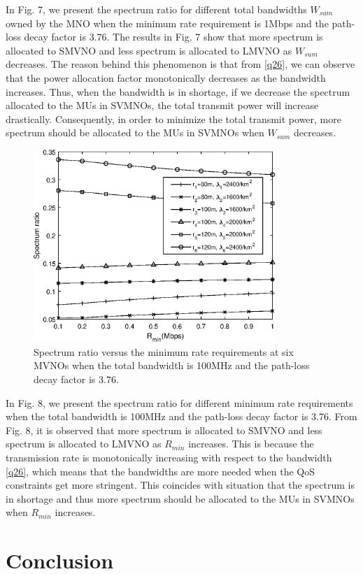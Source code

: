 \documentclass[journal]{IEEEtran}
\begin{document}
In Fig. 7, we present the spectrum ratio for different total bandwidths $W_{sum}$ owned by the MNO when the minimum rate requirement is 1Mbps and the path-loss decay factor is 3.76. The results in Fig. 7 show that more spectrum is allocated to SMVNO and less spectrum is allocated to LMVNO as $W_{sum}$ decreases. The reason behind this phenomenon is that from \eqref{q26}, we can observe that the power allocation factor monotonically decreases as the bandwidth increases. Thus, when the bandwidth is in shortage, if we decrease the spectrum allocated to the MUs in SVMNOs, the total transmit power will increase drastically. Consequently, in order to minimize the total transmit power, more spectrum should be allocated to the MUs in SVMNOs when $W_{sum}$ decreases.

\begin{figure}
	\centering
	\includegraphics[width=3.6in]{SR_rmin.eps}
	\caption{Spectrum ratio versus the minimum rate requirements at six MVNOs when the total bandwidth is 100MHz and the path-loss decay factor is 3.76.}
\end{figure}

In Fig. 8, we present the spectrum ratio for different minimum rate requirements when the total bandwidth is 100MHz and the path-loss decay factor is 3.76. From Fig. 8, it is observed that more spectrum is allocated to SMVNO and less spectrum is allocated to LMVNO as $R_{min}$ increases. This is because the transmission rate is monotonically increasing with respect to the bandwidth \eqref{q26}, which means that the bandwidths are more needed when the QoS constraints get more stringent. This coincides with situation that the spectrum is in shortage and thus more spectrum should be allocated to the MUs in SVMNOs when $R_{min}$ increases.
\section{Conclusion}
\end{document}

